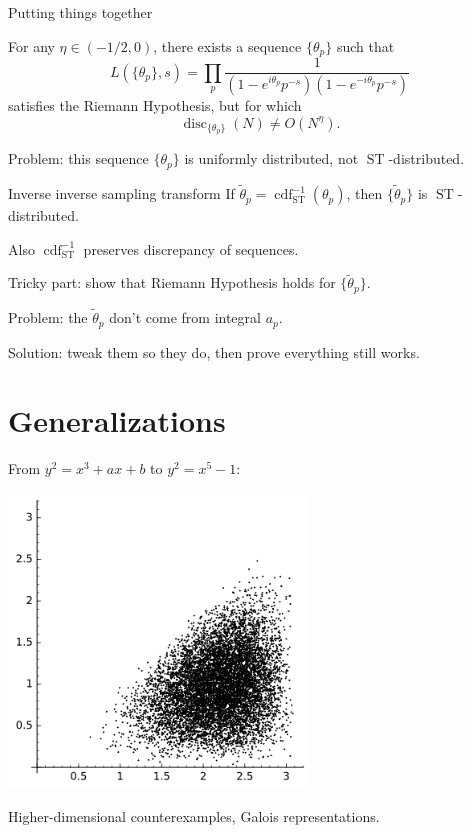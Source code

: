 \documentclass{beamer}
\DeclareMathOperator{\cdf}{cdf}
\DeclareMathOperator{\disc}{disc}
\DeclareMathOperator{\ST}{ST}
\begin{document}
\begin{frame}{Putting things together}
\begin{theorem}
For any $\eta\in (-1/2,0)$, there exists a sequence $\{\theta_p\}$ such that 
\[
	L(\{\theta_p\},s) = \prod_p \frac{1}{(1-e^{i\theta_p} p^{-s})(1-e^{-i\theta_p} p^{-s})}
\]
satisfies the Riemann Hypothesis, but for which 
\[
	\disc_{\{\theta_p\}}(N) \ne O(N^\eta) .
\]
\end{theorem}
\pause

\alert{Problem:} this sequence $\{\theta_p\}$ is uniformly distributed, not 
$\ST$-distributed. 
\end{frame}

\begin{frame}{Inverse inverse sampling transform}
If $\tilde\theta_p = \cdf_{\ST}^{-1}(\theta_p)$, then $\{\tilde\theta_p\}$ is 
$\ST$-distributed. 
\pause

Also $\cdf_{\ST}^{-1}$ preserves discrepancy of sequences. 
\pause

Tricky part: show that Riemann Hypothesis holds for $\{\tilde\theta_p\}$. 
\pause

\alert{Problem:} the $\tilde\theta_p$ don't come from integral $a_p$.
\pause

Solution: tweak them so they do, then prove everything still works. 
\end{frame}





\section{Generalizations}

\begin{frame}
From $y^2=x^3+a x+b$ to $y^2=x^5-1$:
\begin{center}
\includegraphics[width=0.6\textwidth]{genus2}
\end{center}
\pause

Higher-dimensional counterexamples, Galois representations. 
\end{frame}
\end{document}
